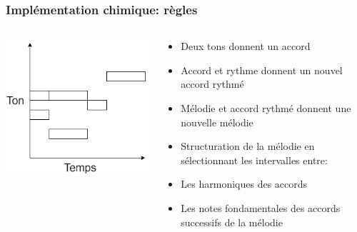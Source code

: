 \documentclass{beamer}
\begin{document}
\begin{frame}
\frametitle{Implémentation chimique: règles}
\begin{columns}

\begin{column}{5cm}
\begin{center}
\includegraphics[scale=0.4]{img/Music.png}
\end{center}
\end{column}

\begin{column}{7cm}
\begin{itemize}
    \item Deux tons donnent un accord
    \item Accord et rythme donnent un nouvel accord rythmé
    \item Mélodie et accord rythmé donnent une nouvelle mélodie
\end{itemize}
\pause
\begin{itemize}
    \item Structuration de la mélodie en sélectionnant les intervalles entre:
    \item Les harmoniques des accords
    \item Les notes fondamentales des accords successifs de la mélodie
\end{itemize}
\end{column}

\end{columns}
\end{frame}
\end{document}
